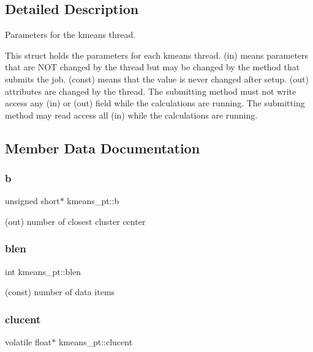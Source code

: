 \subsection{Detailed Description}
Parameters for the kmeans thread. 

This struct holds the parameters for each kmeans thread. (in) means parameters that are N\+OT changed by the thread but may be changed by the method that submits the job. (const) means that the value is never changed after setup. (out) attributes are changed by the thread. The submitting method must not write access any (in) or (out) field while the calculations are running. The submitting method may read access all (in) while the calculations are running. 

\subsection{Member Data Documentation}
\mbox{\label{structkmeans__pt_a00950024e02b55ade4be01f829f7f11d}} 
\subsubsection{\texorpdfstring{b}{b}}
{\footnotesize\ttfamily unsigned short$\ast$ kmeans\+\_\+pt\+::b}



(out) number of closest cluster center 

\mbox{\label{structkmeans__pt_a4346d32e38a81feaf2799f25abf84a16}} 
\subsubsection{\texorpdfstring{blen}{blen}}
{\footnotesize\ttfamily int kmeans\+\_\+pt\+::blen}



(const) number of data items 

\mbox{\label{structkmeans__pt_aca0bb922070f8b7dd1f0e82a4b8ca607}} 
\subsubsection{\texorpdfstring{clucent}{clucent}}
{\footnotesize\ttfamily volatile float$\ast$ kmeans\+\_\+pt\+::clucent}



